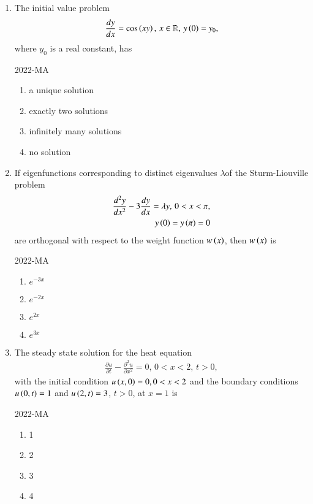 \documentclass[journal,12pt,onecolumn]{IEEEtran}
\theoremstyle{remark}
\begin{document}
\begin{enumerate}
\item The initial value problem 
	\begin{align*}
		\frac{dy}{dx}= \cos \left(xy\right), \, x \in \mathbb{R}, \, y\left(0\right) =y_0,
	\end{align*}
 where $y_0$ is a real constant, has

\hfill{2022-MA}


 	\begin{enumerate}
		\item a unique solution
		\item exactly two solutions
		\item infinitely many solutions
		\item no solution
	\end{enumerate}

\item If eigenfunctions corresponding to distinct eigenvalues $\lambda$of the Sturm-Liouville problem 
	\begin{align*}
		\frac{d^2 y}{dx^2}-3\frac{dy}{dx}= \lambda y, \, 0<x<\pi, \\
		y\left(0\right)=y\left(\pi\right)=0
	\end{align*}
are orthogonal with respect to the weight function $w\left(x\right)$, then $w\left(x\right)$ is

\hfill{2022-MA}

	\begin{enumerate}
		\item $e^{-3x}$
		\item $e^{-2x}$
		\item $e^{2x}$
		\item $e^{3x}$
	\end{enumerate}

\item The steady state solution for the heat equation
	\begin{align*}
		\frac{\partial u}{\partial t}-\frac{\partial^2 u}{\partial x^2}=0, \, 0<x<2, \, t>0,
	\end{align*}
	with the initial condition $u\left(x,0\right)=0, 0<x<2$ and the boundary conditions $u\left(0,t\right)=1$ and $u\left(2,t\right)=3$, $t>0$, at $x=1$ is
	
	\hfill{2022-MA}


	\begin{enumerate}
		\item 1
		\item 2
		\item 3
		\item 4
	\end{enumerate}


\end{enumerate}
\end{document}

